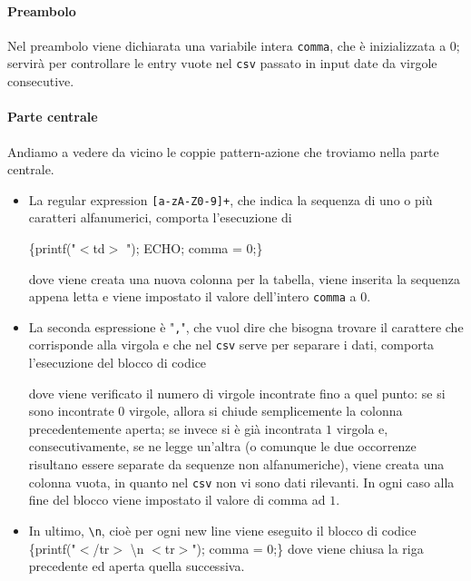 \documentclass[class=book, crop=false, oneside, 12pt]{standalone}
\begin{document}
\paragraph{Preambolo}
Nel preambolo viene dichiarata una variabile intera \texttt{comma}, che è inizializzata a \(0\); servirà per controllare le entry vuote nel \texttt{csv} passato in input date da virgole consecutive.

\paragraph{Parte centrale}
Andiamo a vedere da vicino le coppie pattern-azione che troviamo nella parte centrale.
\begin{itemize}
    \item La regular expression \texttt{[a-zA-Z0-9]+}, che indica la sequenza di uno o più caratteri alfanumerici, comporta l'esecuzione di 
    
    \{printf("\(<\)td\(>\) "); ECHO; comma = 0;\} 
        
    dove viene creata una nuova colonna per la tabella, viene inserita la sequenza appena letta e viene impostato il valore dell'intero \texttt{comma} a \(0\).
    \item La seconda espressione è "\texttt{,}", che vuol dire che bisogna trovare il carattere che corrisponde alla virgola e che nel \texttt{csv} serve per separare i dati, comporta l'esecuzione del blocco di codice
        
    dove viene verificato il numero di virgole incontrate fino a quel punto: se si sono incontrate 0 virgole, allora si chiude semplicemente la colonna precedentemente aperta; se invece si è già incontrata \(1\) virgola e, consecutivamente, se ne legge un'altra (o comunque le due occorrenze risultano essere separate da sequenze non alfanumeriche), viene creata una colonna vuota, in quanto nel \texttt{csv} non vi sono dati rilevanti. In ogni caso alla fine del blocco viene impostato il valore di comma ad \(1\).
    \item In ultimo, \texttt{\textbackslash n}, cioè per ogni new line viene eseguito il blocco di codice \{printf("\(<\)/tr\(>\) \textbackslash n \(<\)tr\(>\)"); comma = 0;\} dove viene chiusa la riga precedente ed aperta quella successiva.
\end{itemize}
\end{document}
